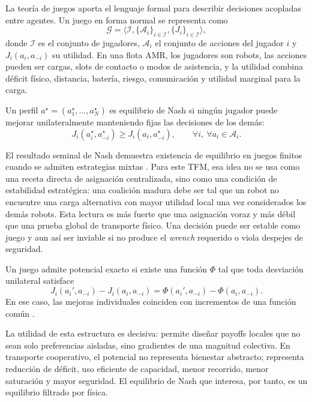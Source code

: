 La teoría de juegos aporta el lenguaje formal para describir decisiones acopladas entre
agentes. Un juego en forma normal se representa como
\[
  \mathcal G=\langle \mathcal I,\{\mathcal A_i\}_{i\in\mathcal I},
  \{J_i\}_{i\in\mathcal I}\rangle ,
\]
donde $\mathcal I$ es el conjunto de jugadores, $\mathcal A_i$ el conjunto de acciones
del jugador $i$ y $J_i(a_i,a_{-i})$ su utilidad. En una flota AMR, los jugadores son
robots, las acciones pueden ser cargas, slots de contacto o modos de asistencia, y la
utilidad combina déficit físico, distancia, batería, riesgo, comunicación y utilidad
marginal para la carga.

\begin{definicion}
Un perfil $a^\star=(a_1^\star,\dots,a_N^\star)$ es equilibrio de Nash si ningún jugador
puede mejorar unilateralmente manteniendo fijas las decisiones de los demás:
\[
  J_i(a_i^\star,a_{-i}^\star)\geq J_i(a_i,a_{-i}^\star),
  \qquad
  \forall i,\ \forall a_i\in\mathcal A_i .
\]
\end{definicion}

El resultado seminal de Nash demuestra existencia de equilibrio en juegos finitos cuando
se admiten estrategias mixtas \citep{nash1950equilibrium,nash1951noncooperative}. Para
este TFM, esa idea no se usa como una receta directa de asignación centralizada, sino
como una condición de estabilidad estratégica: una coalición madura debe ser tal que un
robot no encuentre una carga alternativa con mayor utilidad local una vez considerados
los demás robots. Esta lectura es más fuerte que una asignación voraz y más débil que una
prueba global de transporte físico. Una decisión puede ser estable como juego y aun
así ser inviable si no produce el \emph{wrench} requerido o viola despejes de seguridad.

\begin{definicion}
Un juego admite potencial exacto si existe una función $\Phi$ tal que toda desviación
unilateral satisface
\[
  J_i(a_i',a_{-i})-J_i(a_i,a_{-i})
  =
  \Phi(a_i',a_{-i})-\Phi(a_i,a_{-i}).
\]
En ese caso, las mejoras individuales coinciden con incrementos de una función común
\citep{monderer1996potential}.
\end{definicion}

La utilidad de esta estructura es decisiva: permite diseñar payoffs locales que no sean
solo preferencias aisladas, sino gradientes de una magnitud colectiva. En transporte
cooperativo, el potencial no representa bienestar abstracto; representa reducción de
déficit, uso eficiente de capacidad, menor recorrido, menor saturación y mayor seguridad.
El equilibrio de Nash que interesa, por tanto, es un equilibrio filtrado por física.

